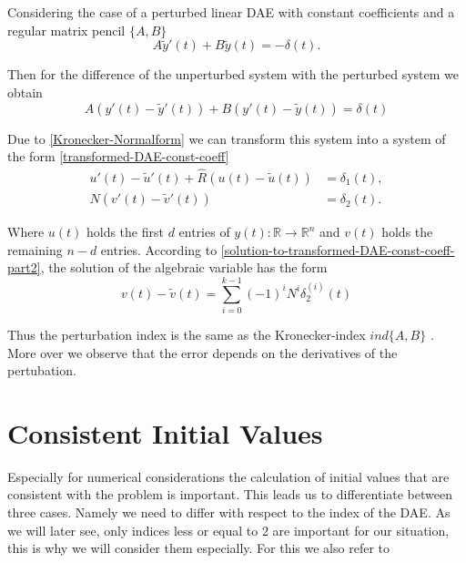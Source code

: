 Considering the case of a perturbed linear DAE with constant coefficients and a regular matrix pencil $\{A,B\}$
\begin{displaymath}
	A \tilde{y}'(t) + B \tilde{y}(t) = -\delta(t).
\end{displaymath}

Then for the difference of the unperturbed system with the perturbed system we obtain
\begin{displaymath}
	A(y'(t)-\tilde{y}'(t)) + B(y'(t)-\tilde{y}(t)) = \delta(t)
\end{displaymath}

Due to \ref{Kronecker-Normalform} we can transform this system into a system of the form \eqref{transformed-DAE-const-coeff} %
\begin{align*}
	u'(t) - \tilde{u}'(t) + \hat{R} (u(t) - \tilde{u}(t) ) &= \delta_1(t), \\
	N(v'(t) - \tilde{v}'(t)) &= \delta_2(t).
\end{align*}

Where $u(t)$ holds the first $d$ entries of $y(t):\mathbb{R} \to \mathbb{R}^n$ and $v(t)$ holds the remaining $n-d$ entries. According to \eqref{solution-to-transformed-DAE-const-coeff-part2}, the solution of the algebraic variable has the form
\begin{displaymath}
	v(t) - \tilde{v}(t) = \sum_{i=0}^{k-1} (-1)^iN^i \delta_2^{(i)}(t) 
\end{displaymath}

Thus the perturbation index is the same as the Kronecker-index $ind\{A,B\}$ \cite{NumerikGewöhnlicherDifferentialgleichungen}. More over we observe that the error depends on the derivatives of the pertubation.



\section{Consistent Initial Values}
\label{sec:consistant initial values}

Especially for numerical considerations the calculation of initial values that are consistent with the problem is important. This leads us to differentiate between three cases. Namely we need to differ with respect to the index of the DAE. As we will later see, only indices less or equal to $2$ are important for our situation, this is why we will consider them especially. For this we also refer to 

